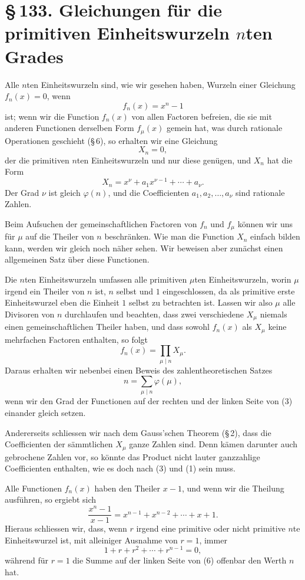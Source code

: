 \documentclass[11pt]{article}
\providecommand{\sect}[2]{\section*{\S\,#1. #2}}
\begin{document}
\sect{133}{Gleichungen für die primitiven Einheitswurzeln $n$ten Grades}

Alle $n$ten Einheitswurzeln sind, wie wir gesehen haben, Wurzeln einer Gleichung $f_n(x)=0$, wenn
\[
\tag{1}        f_n(x)=x^n-1
\]
ist; wenn wir die Function $f_n(x)$ von allen Factoren befreien, die sie mit anderen Functionen derselben Form $f_\mu(x)$ gemein hat, was durch rationale Operationen geschieht (\S\,6), so erhalten wir eine Gleichung
\[
        X_n=0,
\]
der die primitiven $n$ten Einheitswurzeln und nur diese genügen, und $X_n$ hat die Form
\[
\tag{2}        X_n=x^\nu+a_1x^{\nu-1}+\cdots+a_\nu.
\]
Der Grad $\nu$ ist gleich $\varphi(n)$, und die Coefficienten $a_1,a_2,\ldots,a_\nu$ sind rationale Zahlen.

Beim Aufsuchen der gemeinschaftlichen Factoren von $f_n$ und $f_\mu$ können wir uns für $\mu$ auf die Theiler von $n$ beschränken. Wie man die Function $X_n$ einfach bilden kann, werden wir gleich noch näher sehen. Wir beweisen aber zunächst einen allgemeinen Satz über diese Functionen.

Die $n$ten Einheitswurzeln umfassen alle primitiven $\mu$ten Einheitswurzeln, worin $\mu$ irgend ein Theiler von $n$ ist, $n$ selbst und $1$ eingeschlossen, da als primitive erste Einheitswurzel eben die Einheit $1$ selbst zu betrachten ist. Lassen wir also $\mu$ alle Divisoren von $n$ durchlaufen und beachten, dass zwei verschiedene $X_\mu$ niemals einen gemeinschaftlichen Theiler haben, und dass sowohl $f_n(x)$ als $X_\mu$ keine mehrfachen Factoren enthalten, so folgt
\[
\tag{3}        f_n(x)=\prod_{\mu\mid n}X_\mu.
\]
Daraus erhalten wir nebenbei einen Beweis des zahlentheoretischen Satzes
\[
\tag{4}        n=\sum_{\mu\mid n}\varphi(\mu),
\]
wenn wir den Grad der Functionen auf der rechten und der linken Seite von (3) einander gleich setzen.

Andererseits schliessen wir nach dem Gauss'schen Theorem (\S\,2), dass die Coefficienten der sämmtlichen $X_\mu$ ganze Zahlen sind. Denn kämen darunter auch gebrochene Zahlen vor, so könnte das Product nicht lauter ganzzahlige Coefficienten enthalten, wie es doch nach (3) und (1) sein muss.

Alle Functionen $f_n(x)$ haben den Theiler $x-1$, und wenn wir die Theilung ausführen, so ergiebt sich
\[
\tag{5}        \frac{x^n-1}{x-1}=x^{n-1}+x^{n-2}+\cdots+x+1.
\]
Hieraus schliessen wir, dass, wenn $r$ irgend eine primitive oder nicht primitive $n$te Einheitswurzel ist, mit alleiniger Ausnahme von $r=1$, immer
\[
\tag{6}        1+r+r^2+\cdots+r^{n-1}=0,
\]
während für $r=1$ die Summe auf der linken Seite von (6) offenbar den Werth $n$ hat.
\end{document}
